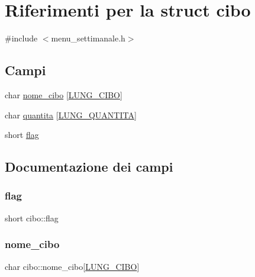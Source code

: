 \hypertarget{structcibo}{}\section{Riferimenti per la struct cibo}
\label{structcibo}


{\ttfamily \#include $<$menu\+\_\+settimanale.\+h$>$}

\subsection*{Campi}
\begin{DoxyCompactItemize}
\item 
char \hyperlink{structcibo_aa6fb1377070abf7a0e84d58931f8372a}{nome\+\_\+cibo} \mbox{[}\hyperlink{menu__settimanale_8h_a09e34227c2761b85eaf76cc08972af12}{L\+U\+N\+G\+\_\+\+C\+I\+BO}\mbox{]}
\item 
char \hyperlink{structcibo_a784c3494d6b72efd717567db1c59380a}{quantita} \mbox{[}\hyperlink{menu__settimanale_8h_af69c340c57cfdd29bd5cec6848afbf16}{L\+U\+N\+G\+\_\+\+Q\+U\+A\+N\+T\+I\+TA}\mbox{]}
\item 
short \hyperlink{structcibo_a134ce16f9fc5d48f08d5482f55c3c4a2}{flag}
\end{DoxyCompactItemize}


\subsection{Documentazione dei campi}
\mbox{\label{structcibo_a134ce16f9fc5d48f08d5482f55c3c4a2}} 
\subsubsection{\texorpdfstring{flag}{flag}}
{\footnotesize\ttfamily short cibo\+::flag}

\mbox{\label{structcibo_aa6fb1377070abf7a0e84d58931f8372a}} 
\subsubsection{\texorpdfstring{nome\+\_\+cibo}{nome\_cibo}}
{\footnotesize\ttfamily char cibo\+::nome\+\_\+cibo\mbox{[}\hyperlink{menu__settimanale_8h_a09e34227c2761b85eaf76cc08972af12}{L\+U\+N\+G\+\_\+\+C\+I\+BO}\mbox{]}}

